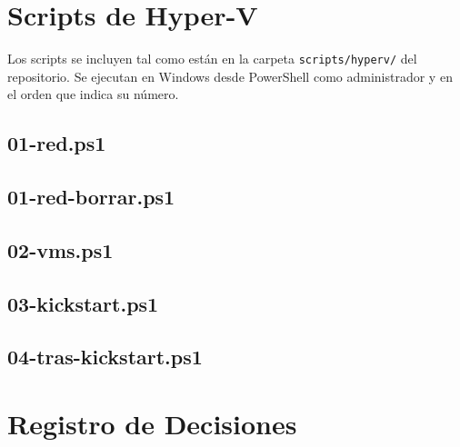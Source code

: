 \documentclass[11pt, a4paper, titlepage]{article}
\newcommand{\cod}[1]{\texttt{#1}}
\begin{document}
\appendix
\section{Scripts de Hyper-V}
\label{ap:scripts}

Los scripts se incluyen tal como están en la carpeta \cod{scripts/hyperv/} del repositorio. Se ejecutan en Windows desde PowerShell como administrador y en el orden que indica su número.

\subsection{01-red.ps1}


\subsection{01-red-borrar.ps1}


\subsection{02-vms.ps1}


\subsection{03-kickstart.ps1}


\subsection{04-tras-kickstart.ps1}


\section{Registro de Decisiones}
\label{ap:decisiones}
\end{document}

